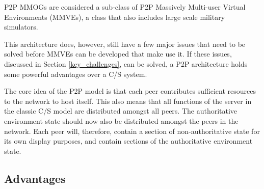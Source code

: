 P2P MMOGs are considered a sub-class of P2P Massively Multi-user Virtual Environments (MMVEs), a class that also includes large scale military simulators.

This architecture does, however, still have a few major issues that need to be solved before MMVEs can be developed that make use it. If these issues, discussed in Section \ref{key_challenges}, can be solved, a P2P architecture holds some powerful advantages over a C/S system.

The core idea of the P2P model is that each peer contributes sufficient resources to the network to host itself. This also means that all functions of the server in the classic C/S model are distributed amongst all peers. The authoritative environment state should now also be distributed amongst the peers in the network. Each peer will, therefore, contain a section of non-authoritative state for its own display purposes, and contain sections of the authoritative environment state.

\subsection{Advantages}
\label{p2p_mmve_advantages}

